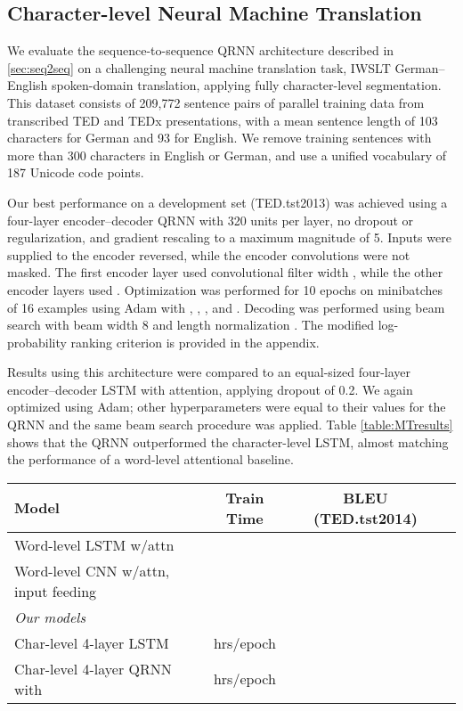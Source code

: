 \documentclass{article} \usepackage{iclr2017_conference,times}
\begin{document}
\subsection{Character-level Neural Machine Translation}

We evaluate the sequence-to-sequence QRNN architecture described in \ref{sec:seq2seq} on a challenging neural machine translation task, IWSLT German--English spoken-domain translation, applying fully character-level segmentation. This dataset consists of 209,772 sentence pairs of parallel training data from transcribed TED and TEDx presentations, with a mean sentence length of 103 characters for German and 93 for English. We remove training sentences with more than 300 characters in English or German, and use a unified vocabulary of 187 Unicode code points.

Our best performance on a development set (TED.tst2013) was achieved using a four-layer encoder--decoder QRNN with 320 units per layer, no dropout or  regularization, and gradient rescaling to a maximum magnitude of 5. Inputs were supplied to the encoder reversed, while the encoder convolutions were not masked. The first encoder layer used convolutional filter width , while the other encoder layers used .
Optimization was performed for 10 epochs on minibatches of 16 examples using Adam \citep{kingma2014adam} with , , , and . Decoding was performed using beam search with beam width 8 and length normalization . The modified log-probability ranking criterion is provided in the appendix.

Results using this architecture were compared to an equal-sized four-layer encoder--decoder LSTM with attention, applying dropout of 0.2. We again optimized using Adam; other hyperparameters were equal to their values for the QRNN and the same beam search procedure was applied. Table \ref{table:MTresults} shows that the QRNN outperformed the character-level LSTM, almost matching the performance of a word-level attentional baseline.
\begin{table*}
\centering
\small
\begin{tabular}{l|ccc}
\toprule
\bf Model & \bf Train Time & \bf BLEU (TED.tst2014) \\
\midrule
Word-level LSTM w/attn \citep{Ranzato2016} &  &  \\
Word-level CNN w/attn, input feeding \citep{Wiseman2016} &  &  \\
\midrule
{\it Our models}\\
Char-level 4-layer LSTM &  hrs/epoch &  \\
Char-level 4-layer QRNN with  &  hrs/epoch &  \\
\bottomrule
\end{tabular}
\caption{
Translation performance, measured by BLEU, and train speed in hours per epoch, for the IWSLT German-English spoken language translation task. All models were trained on in-domain data only, and use negative log-likelihood as the training criterion.
Our models were trained for 10 epochs. The QRNN model uses  for all layers other than the first encoder layer.
}
\label{table:MTresults}
\end{table*}
\end{document}
